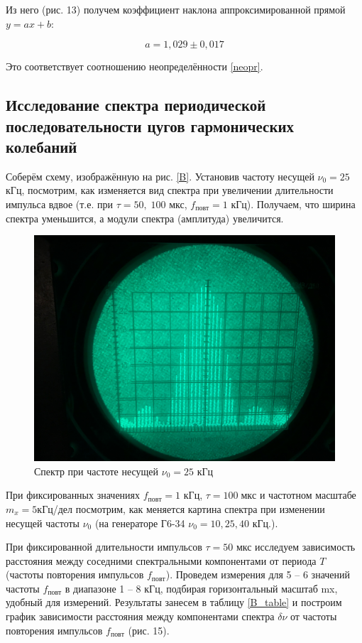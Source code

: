   
  	
  	Из него (рис. 13) получем коэффициент наклона аппроксимированной прямой $ y = ax + b $:  
  	
  	\begin{equation}\label{}
  	a = 1,029 \pm 0,017 
  	\end{equation}
  	
  	Это соответствует соотношению неопределённости \eqref{neopr}. 
  	
  	\subsection{Исследование спектра периодической последовательности цугов гармонических колебаний}
  	
  	Соберём схему, изображённую на рис. \ref{B}. Установив частоту несущей $ \nu_0 = 25  $ кГц, посмотрим, как изменяется вид спектра при увеличении длительности импульса вдвое (т.е. при $ \tau = 50, \; 100 $ мкс, $ f_{повт} = 1 $ кГц). Получаем, что ширина спектра уменьшится, а модули спектра (амплитуда) увеличится. 
  	
  	 \begin{figure}[h]
  		\centering
  		\includegraphics[width=0.65\linewidth]{pics/B_25.jpg}
  		\caption{Спектр при частоте несущей $ \nu_0 = 25 $ кГц}
  		\label{B_25}
  	\end{figure}
  	
  	При фиксированных значениях $  f_{повт} = 1 $ кГц, $ \tau= 100 \; мкс $ и частотном масштабе $ m_x = 5  $кГц/дел посмотрим, как меняется картина спектра при изменении несущей частоты $ \nu_0 $ (на генераторе Г6-34 $ \nu_0 = 10, 25, 40 $ кГц.). 
  	

  	При фиксированной длительности импульсов  $ \tau = 50 $ мкс исследуем зависимость расстояния между соседними спектральными компонентами
  	от периода $ T $ (частоты повторения импульсов $ f_{повт} $). Проведем измерения для 5 -- 6 значений частоты $ f_{повт} $ в диапазоне 1 -- 8 кГц, подбирая горизонтальный масштаб mx, удобный для измерений. Результаты занесем в таблицу \ref{B_table} и построим график зависимости расстояния между компонентами спектра $ \delta \nu $ от частоты повторения импульсов $ f_{повт} $ (рис. 15). 
  
